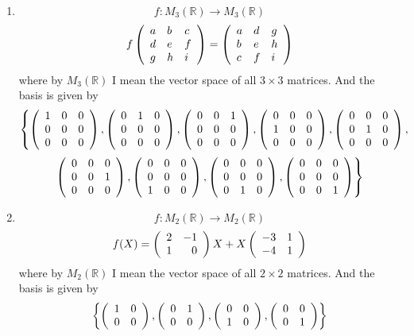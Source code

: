 \documentclass[12pt]{article} %
\begin{document}
\begin{enumerate}
\item \[f:M_3(\mathbb{R})\to M_3(\mathbb{R})\]%
	\[f\left(\begin{array}{lll}a&b&c\\d&e&f\\g&h&i\end{array}\right)=\left(\begin{array}{lll}a&d&g\\b&e&h\\c&f&i\end{array}\right)\]
	where by $M_3(\mathbb{R})$ I mean the vector space of all $3\times3$ matrices. And the basis is given by
	\[\left\{
	\left(\begin{array}{lll}1&0&0\\0&0&0\\0&0&0\end{array}\right),
	\left(\begin{array}{lll}0&1&0\\0&0&0\\0&0&0\end{array}\right),
	\left(\begin{array}{lll}0&0&1\\0&0&0\\0&0&0\end{array}\right),
	\left(\begin{array}{lll}0&0&0\\1&0&0\\0&0&0\end{array}\right),
	\left(\begin{array}{lll}0&0&0\\0&1&0\\0&0&0\end{array}\right),\right.\]\[\left.
	\left(\begin{array}{lll}0&0&0\\0&0&1\\0&0&0\end{array}\right),
	\left(\begin{array}{lll}0&0&0\\0&0&0\\1&0&0\end{array}\right),
	\left(\begin{array}{lll}0&0&0\\0&0&0\\0&1&0\end{array}\right),
	\left(\begin{array}{lll}0&0&0\\0&0&0\\0&0&1\end{array}\right)
	\right\}\]
\item \[f:M_2(\mathbb{R})\to M_2(\mathbb{R})\]%
	\[f(X)=\left(\begin{array}{rr}2&-1\\1&0\end{array}\right)X+X\left(\begin{array}{rr}-3&1\\-4&1\end{array}\right)\]
	where by $M_2(\mathbb{R})$ I mean the vector space of all $2\times2$ matrices. And the basis is given by
	\[\left\{\left(\begin{array}{rr}1&0\\0&0\end{array}\right),\left(\begin{array}{rr}0&1\\0&0\end{array}\right),\left(\begin{array}{rr}0&0\\1&0\end{array}\right),\left(\begin{array}{rr}0&0\\0&1\end{array}\right)\right\}\]
\end{enumerate}
\end{document}
